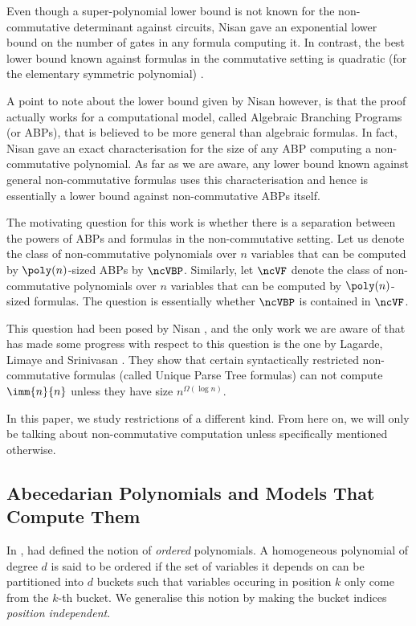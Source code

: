 Even though a super-polynomial lower bound is not known for the non-commutative determinant against circuits, Nisan \cite{N91} gave an exponential lower bound on the number of gates in any formula computing it. 
In contrast, the best lower bound known against formulas in the commutative setting is quadratic (for the elementary symmetric polynomial) \cite{N66,K85,CKSV19}. 

A point to note about the lower bound given by Nisan however, is that the proof actually works for a computational model, called Algebraic Branching Programs (or ABPs), that is believed to be more general than algebraic formulas. 
In fact, Nisan \cite{N91} gave an exact characterisation for the size of any ABP computing a non-commutative polynomial. 
As far as we are aware, any lower bound known against general non-commutative formulas uses this characterisation and hence is essentially a lower bound against non-commutative ABPs itself.

The motivating question for this work is whether there is a separation between the powers of ABPs and formulas in the non-commutative setting. 
Let us denote the class of non-commutative polynomials over $n$ variables that can be computed by $\poly(n)$-sized ABPs by $\ncVBP$. 
Similarly, let $\ncVF$ denote the class of non-commutative polynomials over $n$ variables that can be computed by $\poly(n)$-sized formulas.
The question is essentially whether $\ncVBP$ is contained in $\ncVF$.

This question had been posed by Nisan \cite{N91}, and the only work we are aware of that has made some progress with respect to this question is the one by Lagarde, Limaye and Srinivasan \cite{LLS19}.
They show that certain syntactically restricted non-commutative formulas (called Unique Parse Tree formulas) can not compute $\imm{n}{n}$ unless they have size $n^{\Omega(\log n)}$.

In this paper, we study restrictions of a different kind.
From here on, we will only be talking about non-commutative computation unless specifically mentioned otherwise.

\subsection{Abecedarian Polynomials and Models That Compute Them}

In \cite{HWY11}, {\Hrubes} {\etal} had defined the notion of \emph{ordered} polynomials. 
A homogeneous polynomial of degree $d$ is said to be ordered if the set of variables it depends on can be partitioned into $d$ buckets such that variables occuring in position $k$ only come from the $k$-th bucket.
We generalise this notion by making the bucket indices \emph{position independent}.

